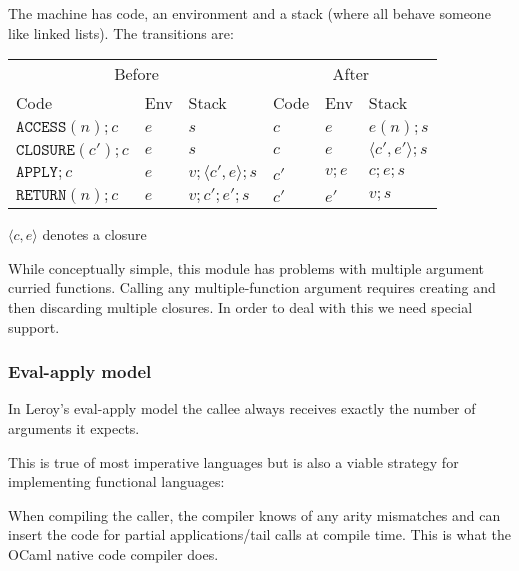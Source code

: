 The machine has code, an environment and a stack (where all behave someone like linked lists). The
transitions are:

\begin{tabular}{llllll}\toprule
    \multicolumn{3}{c}{Before} & \multicolumn{3}{c}{After}
    \\\cmidrule(lr){1-3}\cmidrule(lr){4-6}
    Code                       & Env                       & Stack                          & Code
                               & Env                       & Stack
    \\\midrule
    \(\texttt{ACCESS}(n);c\)   & \(e\)                     & \(s\)                          & \(c\)
                               & \(e\)                     & \(e(n);s\)
    \\
    \(\texttt{CLOSURE}(c');c\) & \(e\)                     & \(s\)                          & \(c\)
                               & \(e\)                     & \(\langle c',
    e'\rangle;s\)
    \\
    \(\texttt{APPLY};c\)       & \(e\)                     & \(v;\langle c', e\rangle ; s\) &
    \(c'\)
                               & \(v; e\)                  & \(c; e; s\)
    \\
    \(\texttt{RETURN}(n);c\)   & \(e\)                     & \(v;c';e';s\)                  &
    \(c'\)
                               & \(e'\)                    & \(v;s\)
    \\\bottomrule
\end{tabular}

\(\langle c, e\rangle\) denotes a closure

While conceptually simple, this module has problems with multiple argument curried functions.
Calling any multiple-function argument requires creating
and then discarding multiple closures. In order to deal with this we need special support.

\subsubsection{Eval-apply model}

In Leroy's eval-apply model the callee always receives exactly the number of arguments it expects.

This is true of most imperative languages but is also a viable strategy for implementing functional
languages:

When compiling the caller, the compiler knows of any arity mismatches and can insert the code for
partial applications/tail calls at compile time. This is what the OCaml native code compiler does.

